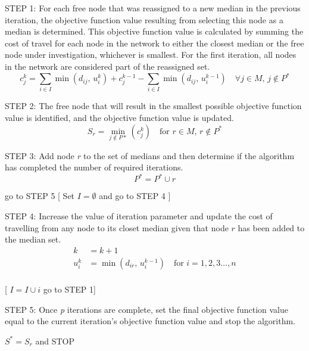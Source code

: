 \documentclass[11pt]{article}
\begin{document}
\begin{algorithm}
\begin{algorithmic}[0]
			
			\Statex
			\Statex STEP 1: For each free node that was reassigned to a new median in the previous iteration, the objective function value resulting from selecting this node as a median is determined.  This objective function value is calculated by summing the cost of travel for each node in the network to either the closest median or the free node under investigation, whichever is smallest.  For the first iteration, all nodes in the network are considered part of the reassigned set.
			\begin{equation*}
			c_j^k = \sum_{i\in I}\min(d_{ij} \text{, } u_i^k) + c_j^{k-1} - \sum_{i\in I}\min(d_{ij} \text{, } u_i^{k-1})\quad \forall j \in M \text{, } j \notin P^*
			\end{equation*}

			
			\Statex
			\Statex STEP 2: The free node that will result in the smallest possible objective function value is identified, and the objective function value is updated.
			\begin{equation*}
			S_r = \min_{j \notin P*}(c_j^k) \quad \text{for } r \in M \text{, } r \notin P^*
			\end{equation*}
			
			\Statex
			\Statex STEP 3: Add node \emph{r} to the set of medians and then determine if the algorithm has completed the number of required iterations.
			\begin{equation*}
			P^* = P^* \cup r
			\end{equation*}
			
			\Statex go to STEP 5
			[
			\Else
			\Statex Set $I = \emptyset$ and go to STEP 4
			]
			\EndIf
			
			
			\Statex
			\Statex STEP 4: Increase the value of iteration parameter and update the cost of travelling from any node to its closet median given that node $r$ has been added to the median set.
			\begin{align*}
			k &= k+1\\
			u_i^k &= \min(d_{ir} \text{, } u_i^{k-1}) \quad \text{for } i = 1,2,3 \dots,n\\
			\end{align*}
			
			[
			\Statex $I=I\cup i$
			\Statex go to STEP 1]
			\EndIf
			
			\Statex
			\Statex STEP 5: Once \emph{p} iterations are complete, set the final objective function value equal to the current iteration's objective function value and stop the algorithm.
			\begin{center}
				$S^{*} = S_r$ and STOP
			\end{center}
			
		\end{algorithmic}
	\end{algorithm}
\end{document}
